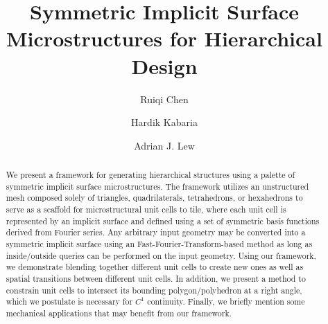 \documentclass[acmtog]{acmart}
\begin{document}
\title{Symmetric Implicit Surface Microstructures for Hierarchical Design}

\author{Ruiqi Chen}
\author{Hardik Kabaria}
\author{Adrian J. Lew}

\renewcommand{\shortauthors}{Chen et al.}

\begin{abstract}
  We present a framework for generating hierarchical structures using a palette of symmetric implicit surface microstructures. The framework utilizes an unstructured mesh composed solely of triangles, quadrilaterals, tetrahedrons, or hexahedrons to serve as a scaffold for microstructural unit cells to tile, where each unit cell is represented by an implicit surface and defined using a set of symmetric basis functions derived from Fourier series. Any arbitrary input geometry may be converted into a symmetric implicit surface using an Fast-Fourier-Transform-based method as long as inside/outside queries can be performed on the input geometry. Using our framework, we demonstrate blending together different unit cells to create new ones as well as spatial transitions between different unit cells. In addition, we present a method to constrain unit cells to intersect its bounding polygon/polyhedron at a right angle, which we postulate is necessary for $C^1$ continuity. Finally, we briefly mention some mechanical applications that may benefit from our framework.
\end{abstract}
\end{document}
